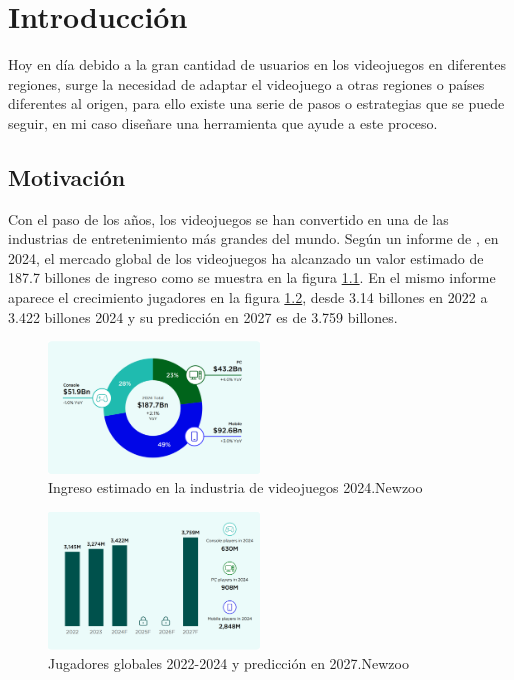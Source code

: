 \chapter{Introducción}
\label{cap:introduccion}
Hoy en día debido a la gran cantidad de usuarios en los videojuegos en diferentes regiones, surge la necesidad de adaptar el videojuego a otras regiones o países diferentes al origen, para ello existe una serie de pasos o estrategias que se puede seguir, en mi caso diseñare una herramienta que ayude a este proceso.
\section{Motivación}
Con el paso de los años, los videojuegos se han convertido en una de las industrias de entretenimiento más grandes del mundo. Según un informe de \cite{NZIngreso2024}, en 2024, el mercado global de los videojuegos ha alcanzado un valor estimado de 187.7 billones de ingreso como se muestra en la figura \ref{fig:NewZooRevenues}. En el mismo informe aparece el crecimiento jugadores en la figura \ref{fig:NewzooPlayers}, desde 3.14 billones en 2022 a 3.422 billones 2024 y su predicción en 2027 es de 3.759 billones.
\begin{figure}[H]
	\centering
	\includegraphics[width = 0.5\textwidth]{Imagenes/Newzoo_2024_Revenues.png}
	\caption{Ingreso estimado en la industria de videojuegos 2024.Newzoo}
	\label{fig:NewZooRevenues}
\end{figure}

\begin{figure}[H]
	\centering
	\includegraphics[width = 0.5\textwidth]{Imagenes/Newzoo_Players.png}
	\caption{Jugadores globales 2022-2024 y predicción en 2027.Newzoo}
	\label{fig:NewzooPlayers}
\end{figure}

